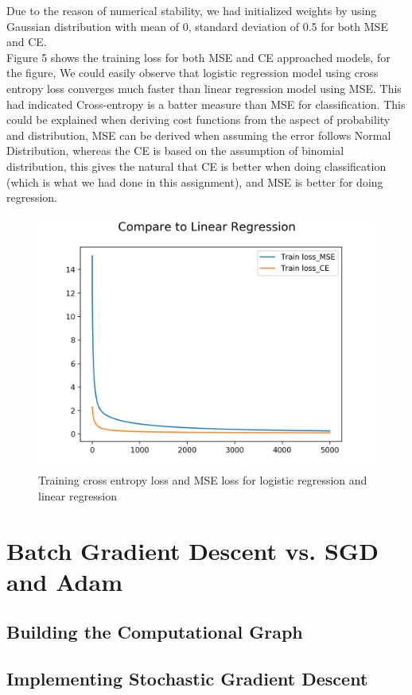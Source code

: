 \documentclass[10pt,letterpaper]{article}
\begin{document}
\qquad Due to the reason of numerical stability, we had initialized weights by using Gaussian distribution with mean of 0, standard deviation of 0.5 for both MSE and CE. \\

Figure 5 shows the training loss for both MSE and CE approached models, for the figure, We could easily observe that logistic regression model using cross entropy loss converges much faster than linear regression model using MSE. This had indicated Cross-entropy is a batter measure than MSE for classification. This could be explained when deriving cost functions from the aspect of probability and distribution, MSE can be derived when assuming the error follows Normal Distribution, whereas the CE is based on the assumption of binomial distribution, this gives the natural that CE is better when doing classification (which is what we had done in this assignment), and MSE is better for doing regression.\\


\begin{figure}[H]
\centering
 \begin{subfig}
  \includegraphics[width=.5\linewidth]{Comparison_loss.png}\hfill
  \caption{Training cross entropy loss and MSE loss for logistic regression and linear regression}
  \end{subfig}
\end{figure}


\section{Batch Gradient Descent vs. SGD and Adam}

\subsection{Building the Computational Graph}



\subsection{Implementing Stochastic Gradient Descent}
\end{document}
